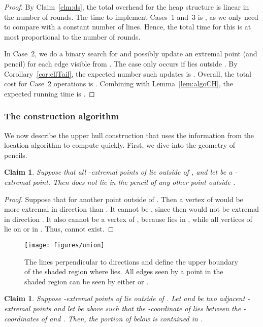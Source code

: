 \documentclass[letterpaper,11pt]{article}
\newtheorem{claim}[theorem]{Claim}
\begin{document}
\begin{proof}
By Claim~\ref{clm:ds},
the total overhead for the heap 
structure is linear in the number
of rounds. The time to implement 
Cases~1 and~3 is , as we only 
need to compare  with a 
constant number of lines. Hence, the 
total time for this is at most proportional to the 
number of rounds. 

In Case~2, we do a binary search 
for  and possibly update 
an extremal point (and pencil) 
for each edge 
visible from . The case
only occurs if  lies 
outside .  By 
Corollary~\ref{cor:ellTail}, the 
expected number such updates is . 
Overall, the total cost for Case~2 
operations is . Combining with 
Lemma~\ref{lem:algoCH}, the expected 
running time is 
.
\end{proof}

\subsubsection{The construction algorithm}

We now describe the upper hull 
construction that uses the information
from the location algorithm to compute
 quickly. First, we dive 
into the geometry of pencils.

\begin{claim}\label{clm:no_pencil_overlap}
  Suppose that all 
  \textup{}-extremal 
  points of  lie outside
  of , and let  be a 
  \textup{}-extremal point. 
  Then  does not lie
  in the pencil of any other point  
  outside .
\end{claim}

\begin{proof}
Suppose that   for 
another point  outside of
.  Then a vertex of  would
be more extremal in direction  than 
. It cannot be , since then
 would not be extremal in direction 
. It also cannot be a
vertex of , because  lies in 
, while all vertices of 
lie on  or in . 
Thus,  cannot exist.
\end{proof}


\begin{figure}
  \centering
  \texttt{[image: figures/union]}
  \caption{The lines perpendicular 
    to directions  and  define 
  the upper boundary of the shaded region 
  where  lies. All edges 
  seen by a point in the shaded region 
  can be seen by either  or .}
  \label{fig:union}
\end{figure}

\begin{claim}\label{clm:extremal_pencil}
  Suppose \textup{}-extremal 
  points of  lie outside
  of . Let  and  be 
  two adjacent \textup{}-extremal 
  points and let  be above  
  such that the -coordinate of
   lies between the -coordinates of  
  and .  Then, the portion of  
  below  is contained 
  in .
\end{claim}
\end{document}
